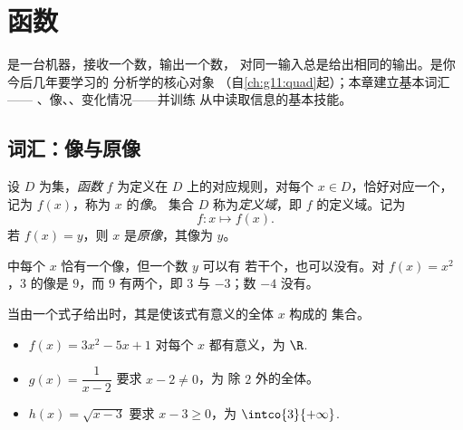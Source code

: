 \chapter{函数}\label{ch:g10:functions}

是一台机器，接收一个数，输出一个数，
对同一输入总是给出相同的输出。是你今后几年要学习的
分析学的核心对象
（自\cref{ch:g11:quad}起）；本章建立基本词汇——
、像、、变化情况——并训练
从中读取信息的基本技能。

\section{词汇：像与原像}

\begin{definition}[函数]\label{def:g10:functions:function}
设 $D$ 为集，\emph{函数} $f$ 为定义在
$D$ 上的对应规则，对每个 $x \in D$，恰好对应一个，
记为 $f(x)$，称为 $x$ 的\emph{像}。
集合 $D$ 称为\emph{定义域}，即 $f$ 的定义域。记为
\[
f : x \longmapsto f(x).
\]
若 $f(x) = y$，则 $x$ 是\emph{原像}，其像为 $y$。
\end{definition}

\begin{remark}
中每个 $x$ 恰有一个像，但一个数 $y$ 可以有
若干个，也可以没有。对 $f(x) = x^2$，$3$ 的像是 $9$，而
$9$ 有两个，即 $3$ 与 $-3$；数 $-4$ 没有。
\end{remark}

\begin{example}[求定义域]\label{ex:g10:functions:domain}
当由一个式子给出时，其是使该式有意义的全体 $x$ 构成的
集合。
\begin{itemize}
  \item $f(x) = 3x^2 - 5x + 1$ 对每个 $x$ 都有意义，为
        $\R$.
  \item $g(x) = \dfrac{1}{x - 2}$ 要求 $x - 2 \neq 0$，为
        除 $2$ 外的全体。
  \item $h(x) = \sqrt{x - 3}$ 要求 $x - 3 \geq 0$，为
        $\intco{3}{+\infty}$.
\end{itemize}
\end{example}

